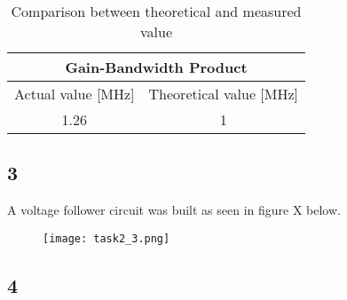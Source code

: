     \begin{table}[htbp]
     \centering
     \caption{Comparison between theoretical and measured value}
       \begin{tabular}{c|c}
        \multicolumn{2}{c}{Gain-Bandwidth Product}\\
        \hline
        Actual value [MHz] & Theoretical value [MHz] \\
       \hline
        1.26          & 1 \\
       \end{tabular}%
     \label{tab:addlabel}%
   \end{table}%

\subsection*{3}

    A voltage follower circuit was built as seen in figure X below.\\
    
    \begin{figure}[h!]
        \centering
        \texttt{[image: task2\_3.png]}
    \end{figure}


\subsection*{4}
